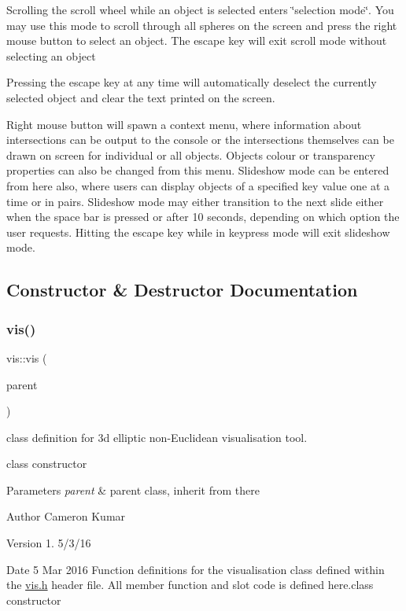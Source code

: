 Scrolling the scroll wheel while an object is selected enters \char`\"{}selection mode\char`\"{}. You may use this mode to scroll through all spheres on the screen and press the right mouse button to select an object. The escape key will exit scroll mode without selecting an object

Pressing the escape key at any time will automatically deselect the currently selected object and clear the text printed on the screen.

Right mouse button will spawn a context menu, where information about intersections can be output to the console or the intersections themselves can be drawn on screen for individual or all objects. Object\textquotesingle{}s colour or transparency properties can also be changed from this menu. Slideshow mode can be entered from here also, where users can display objects of a specified key value one at a time or in pairs. Slideshow mode may either transition to the next slide either when the space bar is pressed or after 10 seconds, depending on which option the user requests. Hitting the escape key while in keypress mode will exit slideshow mode. 

\subsection{Constructor \& Destructor Documentation}
\mbox{\label{classvis_a996ee5697c4a48f0c9ae5743449fc69d}} 
\subsubsection{\texorpdfstring{vis()}{vis()}}
{\footnotesize\ttfamily vis\+::vis (\begin{DoxyParamCaption}\item[{Q\+Widget $\ast$}]{parent }\end{DoxyParamCaption})}



class definition for 3d elliptic non-\/Euclidean visualisation tool. 

class constructor


\begin{DoxyParams}{Parameters}
{\em parent} & parent class, inherit from there\\
\hline
\end{DoxyParams}
\begin{DoxyAuthor}{Author}
Cameron Kumar 
\end{DoxyAuthor}
\begin{DoxyVersion}{Version}
1. 5/3/16 
\end{DoxyVersion}
\begin{DoxyDate}{Date}
5 Mar 2016 Function definitions for the visualisation class defined within the \mbox{\hyperlink{vis_8h_source}{vis.\+h}} header file. All member function and slot code is defined here.\+class constructor
\end{DoxyDate}

